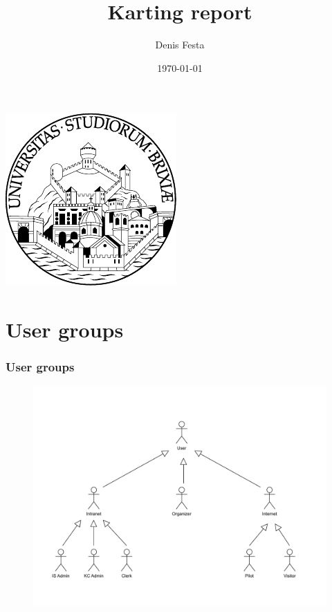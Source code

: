 \documentclass{beamer}
\title{Karting report}
\author{Denis Festa}
\date{\today}
\begin{document}
\begin{frame}
    \titlepage
    \centering
    \includegraphics[width=0.2\linewidth]{unibs-circ-logo.pdf}
\end{frame}



\section*{User groups}

\begin{frame}
\frametitle{User groups}
\begin{figure}
    \centering
    \includegraphics[width=0.8\linewidth]{drawio/users-uc.pdf}
\end{figure}
\end{frame}
\end{document}
